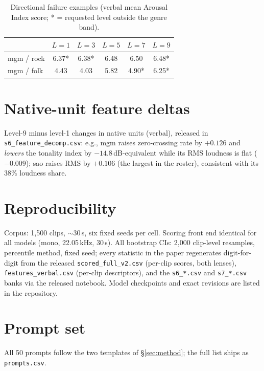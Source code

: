 \documentclass{article}
\newcommand{\inst}{Arousal Index}
\begin{document}
\begin{table}[h]
  \caption{Directional failure examples (verbal mean \inst{} score;
  * = requested level outside the genre band).}
  \label{tab:edge}
  \centering\small
  \begin{tabular}{lccccc}
    \toprule
    & $L{=}1$ & $L{=}3$ & $L{=}5$ & $L{=}7$ & $L{=}9$ \\
    \midrule
    mgm / rock & 6.37* & 6.38* & 6.48 & 6.50 & 6.48* \\
    mgm / folk & 4.43 & 4.03 & 5.82 & 4.90* & 6.25* \\
    \bottomrule
  \end{tabular}
\end{table}

\section{Native-unit feature deltas}
\label{app:feats}
Level-9 minus level-1 changes in native units (verbal), released in
\texttt{s6\_feature\_decomp.csv}: e.g., mgm raises zero-crossing rate by
$+0.126$ and \emph{lowers} the tonality index by $-14.8$\,dB-equivalent while
its RMS loudness is flat ($-0.009$); sao raises RMS by $+0.106$ (the largest
in the roster), consistent with its 38\% loudness share.

\section{Reproducibility}
\label{app:repro}
Corpus: 1{,}500 clips, $\sim$30\,s, six fixed seeds per cell. Scoring front
end identical for all models (mono, 22.05\,kHz, 30\,s). All bootstrap CIs:
2{,}000 clip-level resamples, percentile method, fixed seed; every statistic
in the paper regenerates digit-for-digit from the released
\texttt{scored\_full\_v2.csv} (per-clip scores, both lenses),
\texttt{features\_verbal.csv} (per-clip descriptors), and the
\texttt{s6\_*.csv} and \texttt{s7\_*.csv} banks via the released notebook. Model checkpoints and
exact revisions are listed in the repository.

\section{Prompt set}
\label{app:prompts}
All 50 prompts follow the two templates of \S\ref{sec:method}; the full list
ships as \texttt{prompts.csv}.
\end{document}
